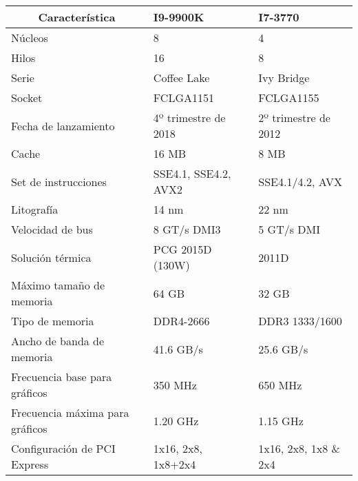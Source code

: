 \begin{tabular}{|p{5.6cm}|p{4cm}|p{4cm}|}
  \hline
  \multicolumn{1}{|c|}{\textbf{Característica}} & \textbf{I9-9900K} & \textbf{I7-3770} \\ \hline
  Núcleos & 8 & 4 \\ \hline
  Hilos & 16 & 8 \\ \hline
  Serie & Coffee Lake & Ivy Bridge \\ \hline
  Socket & FCLGA1151 & FCLGA1155 \\ \hline
  Fecha de lanzamiento & 4º trimestre de 2018 & 2º trimestre de 2012 \\ \hline
  Cache & 16 MB & 8 MB \\ \hline
  Set de instrucciones & SSE4.1, SSE4.2, AVX2 & SSE4.1/4.2, AVX \\ \hline
  Litografía & 14 nm & 22 nm \\ \hline
  Velocidad de bus & 8 GT/s DMI3 & 5 GT/s DMI \\ \hline
  Solución térmica & PCG 2015D (130W) & 2011D \\ \hline
  Máximo tamaño de memoria & 64 GB & 32 GB \\ \hline
  Tipo de memoria & DDR4-2666 & DDR3 1333/1600 \\ \hline
  Ancho de banda de memoria & 41.6 GB/s & 25.6 GB/s \\ \hline
  Frecuencia base para gráficos & 350 MHz & 650 MHz \\ \hline
  Frecuencia máxima para gráficos & 1.20 GHz & 1.15 GHz \\ \hline
  Configuración de PCI Express & 1x16, 2x8, 1x8+2x4 & 1x16, 2x8, 1x8 \& 2x4 \\ \hline
\end{tabular}